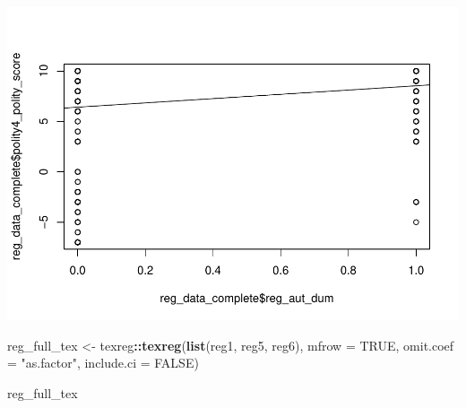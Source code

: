 \documentclass[
]{article}
\newenvironment{Shaded}{\begin{snugshade}}{\end{snugshade}}
\newcommand{\DataTypeTok}[1]{\textcolor[rgb]{0.13,0.29,0.53}{#1}}
\newcommand{\KeywordTok}[1]{\textcolor[rgb]{0.13,0.29,0.53}{\textbf{#1}}}
\newcommand{\NormalTok}[1]{#1}
\newcommand{\OperatorTok}[1]{\textcolor[rgb]{0.81,0.36,0.00}{\textbf{#1}}}
\newcommand{\OtherTok}[1]{\textcolor[rgb]{0.56,0.35,0.01}{#1}}
\newcommand{\StringTok}[1]{\textcolor[rgb]{0.31,0.60,0.02}{#1}}
\begin{document}
\includegraphics{05_tjbrailey_summary_statistics_files/figure-latex/unnamed-chunk-4-5.pdf}

\begin{Shaded}
\begin{Highlighting}[]
\NormalTok{reg_full_tex <-}\StringTok{ }\NormalTok{texreg}\OperatorTok{::}\KeywordTok{texreg}\NormalTok{(}\KeywordTok{list}\NormalTok{(reg1, reg5, reg6), }
                              \DataTypeTok{mfrow =} \OtherTok{TRUE}\NormalTok{, }
                              \DataTypeTok{omit.coef =} \StringTok{"as.factor"}\NormalTok{, }
                              \DataTypeTok{include.ci =} \OtherTok{FALSE}\NormalTok{) }

\NormalTok{reg_full_tex}
\end{Highlighting}
\end{Shaded}
\end{document}
